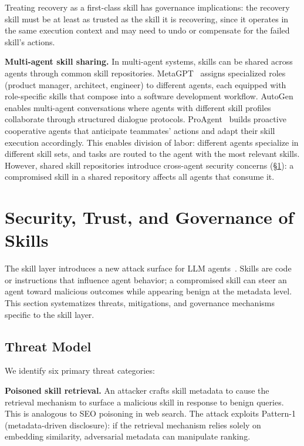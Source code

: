 \documentclass[conference, compsoc]{IEEEtran}
\theoremstyle{plain}
\newcommand{\para}[1]{\smallskip\noindent\textbf{#1.}}
\begin{document}
Treating recovery as a first-class skill has governance implications: the recovery skill must be at least as trusted as the skill it is recovering, since it operates in the same execution context and may need to undo or compensate for the failed skill's actions.

\para{Multi-agent skill sharing}\label{sec:composition:multiagent} In multi-agent systems, skills can be shared across agents through common skill repositories. MetaGPT~\cite{hong2024metagpt} assigns specialized roles (product manager, architect, engineer) to different agents, each equipped with role-specific skills that compose into a software development workflow. AutoGen~\cite{wu2024autogen} enables multi-agent conversations where agents with different skill profiles collaborate through structured dialogue protocols. ProAgent~\cite{zhang2024proagent} builds proactive cooperative agents that anticipate teammates' actions and adapt their skill execution accordingly. This enables division of labor: different agents specialize in different skill sets, and tasks are routed to the agent with the most relevant skills. However, shared skill repositories introduce cross-agent security concerns (\S\ref{sec:security}): a compromised skill in a shared repository affects all agents that consume it.

\section{Security, Trust, and Governance of Skills}
\label{sec:security}

The skill layer introduces a new attack surface for LLM agents~\cite{shahriar2025survey}. Skills are code or instructions that influence agent behavior; a compromised skill can steer an agent toward malicious outcomes while appearing benign at the metadata level. This section systematizes threats, mitigations, and governance mechanisms specific to the skill layer.

\subsection{Threat Model}
\label{sec:security:threats}

We identify six primary threat categories:

\para{Poisoned skill retrieval} An attacker crafts skill metadata to cause the retrieval mechanism to surface a malicious skill in response to benign queries. This is analogous to SEO poisoning in web search. The attack exploits Pattern-1 (metadata-driven disclosure): if the retrieval mechanism relies solely on embedding similarity, adversarial metadata can manipulate ranking.
\end{document}
